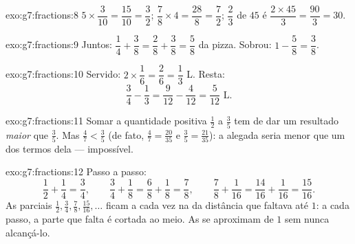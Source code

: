 \begin{solution}{exo:g7:fractions:8}
$5 \times \dfrac{3}{10} = \dfrac{15}{10} = \dfrac32$; \quad
$\dfrac78 \times 4 = \dfrac{28}{8} = \dfrac72$; \quad
$\dfrac23$ de $45$ é $\dfrac{2 \times 45}{3} = \dfrac{90}{3} = 30$.
\end{solution}

\begin{solution}{exo:g7:fractions:9}
Juntos: $\dfrac14 + \dfrac38 = \dfrac28 + \dfrac38 = \dfrac58$ da
pizza. Sobrou: $1 - \dfrac58 = \dfrac38$.
\end{solution}

\begin{solution}{exo:g7:fractions:10}
Servido: $2 \times \dfrac16 = \dfrac26 = \dfrac13$ L. Resta:
\[
\frac34 - \frac13 = \frac{9}{12} - \frac{4}{12} = \frac{5}{12}
\text{ L}.
\]
\end{solution}

\begin{solution}{exo:g7:fractions:11}
Somar a quantidade positiva $\frac12$ a $\frac35$ tem de dar um
resultado \emph{maior} que $\frac35$. Mas $\frac47 < \frac35$ (de
fato, $\frac47 = \frac{20}{35}$ e $\frac35 = \frac{21}{35}$): a 
alegada seria menor que um dos termos dela --- impossível.
\end{solution}

\begin{solution}{exo:g7:fractions:12}
Passo a passo:
\[
\frac12 + \frac14 = \frac34, \qquad
\frac34 + \frac18 = \frac68 + \frac18 = \frac78, \qquad
\frac78 + \frac1{16} = \frac{14}{16} + \frac1{16} = \frac{15}{16}.
\]
As  parciais $\frac12, \frac34, \frac78, \frac{15}{16}, \dots$
ficam a cada vez na  da distância que faltava até $1$: a cada
passo, a parte que falta é cortada ao meio. As  se aproximam de
$1$ sem nunca alcançá-lo.
\end{solution}

